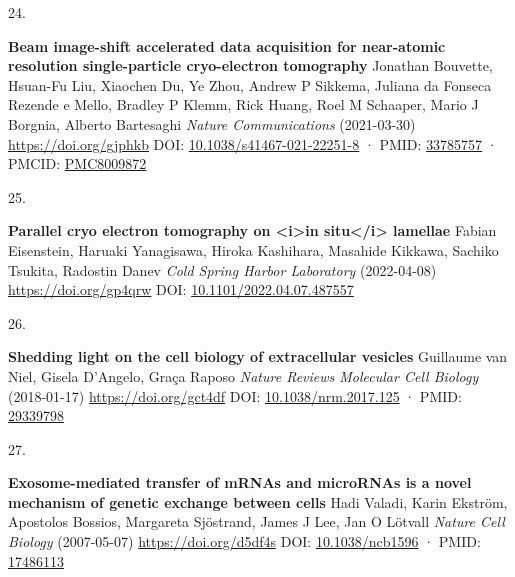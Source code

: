 \documentclass[
]{article}
\newlength{\cslhangindent}
\newlength{\csllabelwidth}
\newlength{\cslentryspacingunit} %
\newenvironment{CSLReferences}[2] %
 {%
  \setlength{\parindent}{0pt}
  \ifodd #1
  \let\oldpar\par
  \def\par{\hangindent=\cslhangindent\oldpar}
  \fi
  \setlength{\parskip}{#2\cslentryspacingunit}
 }%
 {}
\newcommand{\CSLBlock}[1]{#1\hfill\break}
\newcommand{\CSLLeftMargin}[1]{\parbox[t]{\csllabelwidth}{#1}}
\newcommand{\CSLRightInline}[1]{\parbox[t]{\linewidth - \csllabelwidth}{#1}\break}
\providecommand{\DIFaddbegin}{} %
\providecommand{\DIFaddend}{} %
\providecommand{\DIFdelbegin}{} %
\providecommand{\DIFdelend}{} %
\newcommand{\DIFscaledelfig}{0.5}
\newlength{\DIFdelgraphicswidth} %
\newlength{\DIFdelgraphicsheight} %
\newcommand{\DIFaddincludegraphics}[2][]{{\color{blue}\fbox{\DIFOincludegraphics[#1]{#2}}}} %
\newcommand{\DIFdelincludegraphics}[2][]{%
\sbox{\DIFdelgraphicsbox}{\DIFOincludegraphics[#1]{#2}}%
\settoboxwidth{\DIFdelgraphicswidth}{\DIFdelgraphicsbox} %
\settoboxtotalheight{\DIFdelgraphicsheight}{\DIFdelgraphicsbox} %
\scalebox{\DIFscaledelfig}{%
\parbox[b]{\DIFdelgraphicswidth}{\usebox{\DIFdelgraphicsbox}\\[-\baselineskip] \rule{\DIFdelgraphicswidth}{0em}}\llap{\resizebox{\DIFdelgraphicswidth}{\DIFdelgraphicsheight}{%
\setlength{\unitlength}{\DIFdelgraphicswidth}%
\begin{picture}(1,1)%
\thicklines\linethickness{2pt} %
{\color[rgb]{1,0,0}\put(0,0){\framebox(1,1){}}}%
{\color[rgb]{1,0,0}\put(0,0){\line( 1,1){1}}}%
{\color[rgb]{1,0,0}\put(0,1){\line(1,-1){1}}}%
\end{picture}%
}\hspace*{3pt}}} %
} %
\DeclareRobustCommand{\DIFaddbegin}{\DIFOaddbegin \let\includegraphics\DIFaddincludegraphics} %
\DeclareRobustCommand{\DIFaddend}{\DIFOaddend \let\includegraphics\DIFOincludegraphics} %
\DeclareRobustCommand{\DIFdelbegin}{\DIFOdelbegin \let\includegraphics\DIFdelincludegraphics} %
\DeclareRobustCommand{\DIFdelend}{\DIFOaddend \let\includegraphics\DIFOincludegraphics} %
\begin{document}
\begin{CSLReferences}{0}{0}
\leavevmode{}%
\DIFdelbegin %
\DIFdelend \DIFaddbegin \CSLLeftMargin{24. }\DIFaddend %
\CSLRightInline{\textbf{Beam image-shift accelerated data acquisition for near-atomic resolution single-particle cryo-electron tomography}
\CSLBlock{Jonathan Bouvette, Hsuan-Fu Liu, Xiaochen Du, Ye Zhou, Andrew P Sikkema, Juliana da Fonseca Rezende e Mello, Bradley P Klemm, Rick Huang, Roel M Schaaper, Mario J Borgnia, Alberto Bartesaghi} \emph{Nature Communications} (2021-03-30) \url{https://doi.org/gjphkb}
\CSLBlock{DOI: \href{https://doi.org/10.1038/s41467-021-22251-8}{10.1038/s41467-021-22251-8} · PMID: \href{https://www.ncbi.nlm.nih.gov/pubmed/33785757}{33785757} · PMCID: \href{https://www.ncbi.nlm.nih.gov/pmc/articles/PMC8009872}{PMC8009872}}}

\leavevmode{}%
\DIFdelbegin %
\DIFdelend \DIFaddbegin \CSLLeftMargin{25. }\DIFaddend %
\CSLRightInline{\textbf{Parallel cryo electron tomography on \textless i\textgreater in situ\textless/i\textgreater{} lamellae}
\CSLBlock{Fabian Eisenstein, Haruaki Yanagisawa, Hiroka Kashihara, Masahide Kikkawa, Sachiko Tsukita, Radostin Danev} \emph{Cold Spring Harbor Laboratory} (2022-04-08) \url{https://doi.org/gp4qrw}
\CSLBlock{DOI: \href{https://doi.org/10.1101/2022.04.07.487557}{10.1101/2022.04.07.487557}}}

\leavevmode{}%
\DIFdelbegin %
\DIFdelend \DIFaddbegin \CSLLeftMargin{26. }\DIFaddend %
\DIFdelbegin %
\DIFdelend \DIFaddbegin \CSLRightInline{\textbf{Shedding light on the cell biology of extracellular vesicles}
\CSLBlock{Guillaume van Niel, Gisela D'Angelo, Graça Raposo} \emph{Nature Reviews Molecular Cell Biology} (2018-01-17) \url{https://doi.org/gct4df}
\CSLBlock{DOI: \href{https://doi.org/10.1038/nrm.2017.125}{10.1038/nrm.2017.125} · PMID: \href{https://www.ncbi.nlm.nih.gov/pubmed/29339798}{29339798}}}
\DIFaddend 

\leavevmode{}%
\DIFdelbegin %
\DIFdelend \DIFaddbegin \CSLLeftMargin{27. }\DIFaddend %
\CSLRightInline{\textbf{Exosome-mediated transfer of mRNAs and microRNAs is a novel mechanism of genetic exchange between cells}
\CSLBlock{Hadi Valadi, Karin Ekström, Apostolos Bossios, Margareta Sjöstrand, James J Lee, Jan O Lötvall} \emph{Nature Cell Biology} (2007-05-07) \url{https://doi.org/d5df4s}
\CSLBlock{DOI: \href{https://doi.org/10.1038/ncb1596}{10.1038/ncb1596} · PMID: \href{https://www.ncbi.nlm.nih.gov/pubmed/17486113}{17486113}}}


\end{CSLReferences}
\end{document}
